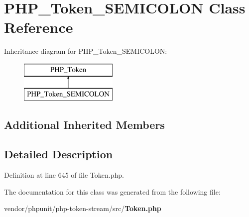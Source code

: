 \section{P\+H\+P\+\_\+\+Token\+\_\+\+S\+E\+M\+I\+C\+O\+L\+O\+N Class Reference}
\label{class_p_h_p___token___s_e_m_i_c_o_l_o_n}
Inheritance diagram for P\+H\+P\+\_\+\+Token\+\_\+\+S\+E\+M\+I\+C\+O\+L\+O\+N\+:\begin{figure}[H]
\begin{center}
\leavevmode
\includegraphics[height=2.000000cm]{class_p_h_p___token___s_e_m_i_c_o_l_o_n}
\end{center}
\end{figure}
\subsection*{Additional Inherited Members}


\subsection{Detailed Description}


Definition at line 645 of file Token.\+php.



The documentation for this class was generated from the following file\+:\begin{DoxyCompactItemize}
\item 
vendor/phpunit/php-\/token-\/stream/src/{\bf Token.\+php}\end{DoxyCompactItemize}
